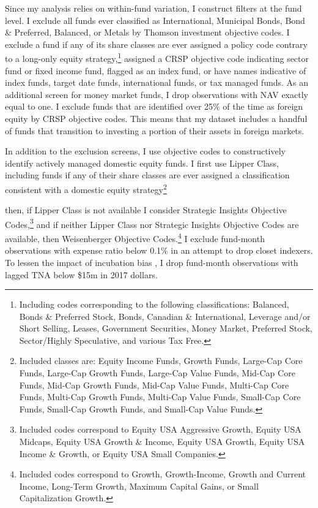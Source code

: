 \documentclass[openany]{book}
\let\rmarkdownfootnote\footnote%
\def\footnote{\protect\rmarkdownfootnote}
\theoremstyle{definition}
\theoremstyle{definition}
\theoremstyle{definition}
\theoremstyle{remark}
\begin{document}
Since my analysis relies on within-fund variation, I construct filters
at the fund level. I exclude all funds ever classified as International,
Municipal Bonds, Bond \& Preferred, Balanced, or Metals by Thomson
investment objective codes. I exclude a fund if any of its share classes
are ever assigned a policy code contrary to a long-only equity
strategy,\footnote{Including codes corresponding to the following
  classifications: Balanced, Bonds \& Preferred Stock, Bonds, Canadian
  \& International, Leverage and/or Short Selling, Leases, Government
  Securities, Money Market, Preferred Stock, Sector/Highly Speculative,
  and various Tax Free.} assigned a CRSP objective code indicating
sector fund or fixed income fund, flagged as an index fund, or have
names indicative of index funds, target date funds, international funds,
or tax managed funds. As an additional screen for money market funds, I
drop observations with NAV exactly equal to one. I exclude funds that
are identified over 25\% of the time as foreign equity by CRSP objective
codes. This means that my dataset includes a handful of funds that
transition to investing a portion of their assets in foreign markets.

In addition to the exclusion screens, I use objective codes to
constructively identify actively managed domestic equity funds. I first
use Lipper Class, including funds if any of their share classes are ever
assigned a classification consistent with a domestic equity
strategy\footnote{Included classes are: Equity Income Funds, Growth
  Funds, Large-Cap Core Funds, Large-Cap Growth Funds, Large-Cap Value
  Funds, Mid-Cap Core Funds, Mid-Cap Growth Funds, Mid-Cap Value Funds,
  Multi-Cap Core Funds, Multi-Cap Growth Funds, Multi-Cap Value Funds,
  Small-Cap Core Funds, Small-Cap Growth Funds, and Small-Cap Value
  Funds.}

then, if Lipper Class is not available I consider Strategic Insights
Objective Codes,\footnote{Included codes correspond to Equity USA
  Aggressive Growth, Equity USA Midcaps, Equity USA Growth \& Income,
  Equity USA Growth, Equity USA Income \& Growth, or Equity USA Small
  Companies.} and if neither Lipper Class nor Strategic Insights
Objective Codes are available, then Weisenberger Objective
Codes.\footnote{Included codes correspond to Growth, Growth-Income,
  Growth and Current Income, Long-Term Growth, Maximum Capital Gains, or
  Small Capitalization Growth.} I exclude fund-month observations with
expense ratio below 0.1\% in an attempt to drop closet indexers. To
lessen the impact of incubation bias \citep{evans10}, I drop fund-month
observations with lagged TNA below \$15m in 2017 dollars.
\end{document}
